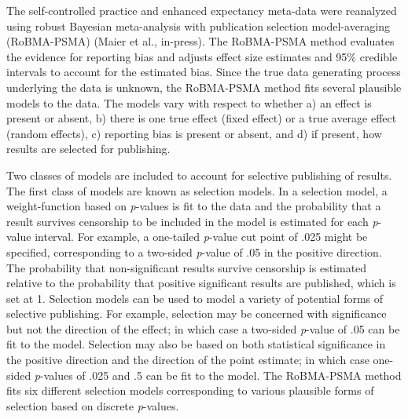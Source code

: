 \documentclass[
  man, donotrepeattitle,floatsintext]{apa7}
\begin{document}
The self-controlled practice and enhanced expectancy meta-data were reanalyzed using robust Bayesian meta-analysis with publication selection model-averaging (RoBMA-PSMA) (Maier et al., in-press). The RoBMA-PSMA method evaluates the evidence for reporting bias and adjusts effect size estimates and 95\% credible intervals to account for the estimated bias. Since the true data generating process underlying the data is unknown, the RoBMA-PSMA method fits several plausible models to the data. The models vary with respect to whether a) an effect is present or absent, b) there is one true effect (fixed effect) or a true average effect (random effects), c) reporting bias is present or absent, and d) if present, how results are selected for publishing.

Two classes of models are included to account for selective publishing of results. The first class of models are known as selection models. In a selection model, a weight-function based on \emph{p}-values is fit to the data and the probability that a result survives censorship to be included in the model is estimated for each \emph{p}-value interval. For example, a one-tailed \emph{p}-value cut point of .025 might be specified, corresponding to a two-sided \emph{p}-value of .05 in the positive direction. The probability that non-significant results survive censorship is estimated relative to the probability that positive significant results are published, which is set at 1. Selection models can be used to model a variety of potential forms of selective publishing. For example, selection may be concerned with significance but not the direction of the effect; in which case a two-sided \emph{p}-value of .05 can be fit to the model. Selection may also be based on both statistical significance in the positive direction and the direction of the point estimate; in which case one-sided \emph{p}-values of .025 and .5 can be fit to the model. The RoBMA-PSMA method fits six different selection models corresponding to various plausible forms of selection based on discrete \emph{p}-values.
\end{document}
